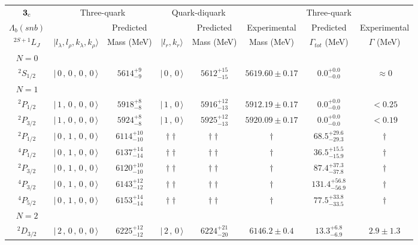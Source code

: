 \begin{tabular}{c| c c c c c c c}\hline \hline
${\bf {3}}_{\rm c}$ & \multicolumn{2}{c}{Three-quark} &  \multicolumn{2}{c}{Quark-diquark}   &    &  Three-quark  &\\ 
$\Lambda_{b}(snb)$ &   & Predicted  &   &  Predicted   &  Experimental &  Predicted            & Experimental \\ 
 $^{2S+1}L_{J}$ & $\vert l_{\lambda}, l_{\rho}, k_{\lambda}, k_{\rho} \rangle$ & Mass (MeV)  & $\vert l_{r}, k_{r} \rangle$  &  Mass (MeV)   &  Mass (MeV)   &  $\Gamma_{tot}$ (MeV) & $\Gamma$ (MeV) \\ \hline
\hline
 $N=0$  &  &  &  &  &  \\ 
$^{2}S_{1/2}$ & $\vert \,0\,,\,0\,,\,0\,,\,0 \,\rangle $ & $5614^{+9}_{-9}$ & $\vert \,0\,,\,0 \,\rangle$ & $5612^{+15}_{-15}$ & $5619.60\pm 0.17$ & $0.0^{+0.0}_{-0.0}$ & $\approx 0$ \\ 
\hline
 $N=1$  &  &  &  &  &  \\ 
$^{2}P_{1/2}$ & $\vert \,1\,,\,0\,,\,0\,,\,0 \,\rangle $ & $5918^{+8}_{-8}$ & $\vert \,1\,,\,0 \,\rangle$ & $5916^{+12}_{-13}$ & $5912.19\pm 0.17$ & $0.0^{+0.0}_{-0.0}$ & $<0.25$ \\ 
$^{2}P_{3/2}$ & $\vert \,1\,,\,0\,,\,0\,,\,0 \,\rangle $ & $5924^{+8}_{-8}$ & $\vert \,1\,,\,0 \,\rangle$ & $5925^{+12}_{-13}$ & $5920.09\pm 0.17$ & $0.0^{+0.0}_{-0.0}$ & $<0.19$ \\ 
$^{2}P_{1/2}$ & $\vert \,0\,,\,1\,,\,0\,,\,0 \,\rangle $ & $6114^{+10}_{-10}$ & $\dagger\dagger$ & $\dagger\dagger$ & $\dagger$ & $68.5^{+29.6}_{-29.3}$ & $\dagger$ \\ 
$^{4}P_{1/2}$ & $\vert \,0\,,\,1\,,\,0\,,\,0 \,\rangle $ & $6137^{+14}_{-14}$ & $\dagger\dagger$ & $\dagger\dagger$ & $\dagger$ & $36.5^{+15.5}_{-15.9}$ & $\dagger$ \\ 
$^{2}P_{3/2}$ & $\vert \,0\,,\,1\,,\,0\,,\,0 \,\rangle $ & $6120^{+10}_{-10}$ & $\dagger\dagger$ & $\dagger\dagger$ & $\dagger$ & $87.4^{+37.3}_{-37.8}$ & $\dagger$ \\ 
$^{4}P_{3/2}$ & $\vert \,0\,,\,1\,,\,0\,,\,0 \,\rangle $ & $6143^{+12}_{-12}$ & $\dagger\dagger$ & $\dagger\dagger$ & $\dagger$ & $131.4^{+56.8}_{-56.9}$ & $\dagger$ \\ 
$^{4}P_{5/2}$ & $\vert \,0\,,\,1\,,\,0\,,\,0 \,\rangle $ & $6153^{+14}_{-14}$ & $\dagger\dagger$ & $\dagger\dagger$ & $\dagger$ & $77.5^{+33.8}_{-33.5}$ & $\dagger$ \\ 
\hline
 $N=2$  &  &  &  &  &  \\ 
$^{2}D_{3/2}$ & $\vert \,2\,,\,0\,,\,0\,,\,0 \,\rangle $ & $6225^{+12}_{-12}$ & $\vert \,2\,,\,0 \,\rangle$ & $6224^{+21}_{-20}$ & $6146.2\pm 0.4$ & $13.3^{+6.8}_{-6.9}$ & $2.9\pm 1.3$ \\ 

\end{tabular}
